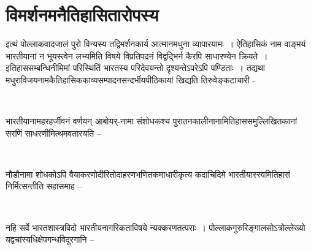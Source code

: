 \section*{विमर्शनमनैतिहासितारोपस्य}

इत्थं पोल्लाकवादजालं पुरो विन्यस्य तद्विमर्शनकार्य आत्मानमधुना व्यापारयामः~। ऐतिहासिकं नाम वाङ्मयं भारतीयानां न भूयस्त्वेन लभ्यमिति विषये विप्रतिपदनं विद्वद्भिर्न कैरपि साधारण्येन क्रियते~। इतिहाससम्बन्धिनीमिमां परिस्थितिं भारतस्य परिदेवयन्तो दृश्यन्तेऽपरेऽपि पण्डिताः~। तद्यथा मधुराविजयनामकैतिहासिककाव्यसम्पादनसन्दर्भीयपीठिकायां खिद्यति तिरुवेङ्कटाचारी -

\begin{myquote}

~\hfill {}
\end{myquote}

भारतीयानामहरहर्जीवनं वर्णयन् आबोयर्-नामा संशोधकश्च पुरातनकालीनानामितिहाससमुल्लिखितकानां सरणिं साधरणीमित्थमवतारयति –

\begin{myquote}

~\hfill {}
\end{myquote}

नौडौनामा शोधकोऽपि वैयाकरणोदीरितोदाहरणभणितकमाधारीकृत्य कदाचिदिमे भारतीयास्स्वमितिहासं निर्मित्सन्तीति सहासमाह –

\newpage

\begin{myquote}

~\hfill {}
\end{myquote}

नहि सर्वे भारतशास्त्रविदो  भारतीयनागरिकताविषये न्यक्करणतत्पराः~। पोल्लाकगुरुरिङ्गालसोऽत्रोल्लेख्यो यद्वचांस्यधिक्षेपगन्धविदूरगानि –

